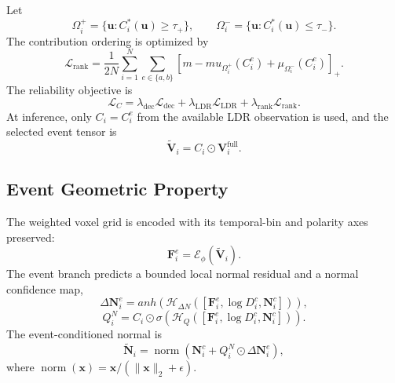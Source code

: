 Let
\begin{equation}
    \Omega_i^{+}=\{\bm u:C_i^{*}(\bm u)\geq\tau_{+}\},
    \qquad
    \Omega_i^{-}=\{\bm u:C_i^{*}(\bm u)\leq\tau_{-}\}.
\end{equation}
The contribution ordering is optimized by
\begin{equation}
    \mathcal{L}_{\mathrm{rank}}=
    \frac{1}{2N}\sum_{i=1}^{N}\sum_{e\in\{a,b\}}
    \left[
    m-mu_{\Omega_i^{+}}(C_i^{e})
    +\mu_{\Omega_i^{-}}(C_i^{e})
    \right]_{+}.
    \label{eq:contribution_ranking}
\end{equation}
The reliability objective is
\begin{equation}
    \boxed{
    \mathcal{L}_{C}=
    \lambda_{\mathrm{dec}}\mathcal{L}_{\mathrm{dec}}+
    \lambda_{\mathrm{LDR}}\mathcal{L}_{\mathrm{LDR}}+
    \lambda_{\mathrm{rank}}\mathcal{L}_{\mathrm{rank}}.}
    \label{eq:reliability_objective}
\end{equation}
At inference, only $C_i=C_i^{e}$ from the available LDR observation is used,
and the selected event tensor is
\begin{equation}
    \widetilde{\bm V}_i=C_i\odot\bm V_i^{\mathrm{full}}.
    \label{eq:reliability_weighted_event}
\end{equation}


\subsection{Event Geometric Property}
\label{sec:event_normal_property}

The weighted voxel grid is encoded with its temporal-bin and polarity axes
preserved:
\begin{equation}
    \bm F_i^{e}=\mathcal{E}_{\phi}(\widetilde{\bm V}_i).
    \label{eq:event_feature_encoding}
\end{equation}
The event branch predicts a bounded local normal residual and a normal
confidence map,
\begin{equation}
    \Delta\bm N_i^{e}=	anh\!\left(
    \mathcal{H}_{\Delta N}
    ([\bm F_i^{e},\log D_i^{c},\bm N_i^{c}])\right),
    \label{eq:event_normal_residual}
\end{equation}
\begin{equation}
    Q_i^{N}=C_i\odot\sigma\!\left(
    \mathcal{H}_{Q}
    ([\bm F_i^{e},\log D_i^{c},\bm N_i^{c}])\right).
    \label{eq:normal_confidence}
\end{equation}
The event-conditioned normal is
\begin{equation}
    \boxed{
    \widetilde{\bm N}_i=
    \operatorname{norm}\!\left(
    \bm N_i^{c}+Q_i^{N}\odot\Delta\bm N_i^{e}
    \right),}
    \label{eq:event_conditioned_normal}
\end{equation}
where $\operatorname{norm}(\bm x)=\bm x/
(\|\bm x\|_2+\epsilon)$.


